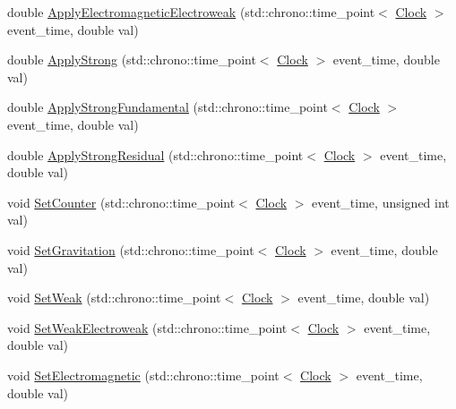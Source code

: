 \begin{DoxyCompactItemize}
\item 
double \mbox{\hyperlink{classCompositeForceParticle_a5f6aef9e15e2e5f346c7ede76ae6458b}{Apply\+Electromagnetic\+Electroweak}} (std\+::chrono\+::time\+\_\+point$<$ \mbox{\hyperlink{universe_8h_a0ef8d951d1ca5ab3cfaf7ab4c7a6fd80}{Clock}} $>$ event\+\_\+time, double val)
\item 
double \mbox{\hyperlink{classCompositeForceParticle_ac1464a04fbbca2d8927dfdbef0429878}{Apply\+Strong}} (std\+::chrono\+::time\+\_\+point$<$ \mbox{\hyperlink{universe_8h_a0ef8d951d1ca5ab3cfaf7ab4c7a6fd80}{Clock}} $>$ event\+\_\+time, double val)
\item 
double \mbox{\hyperlink{classCompositeForceParticle_a64fe19ee12d6ca0a69f650faa5bedb58}{Apply\+Strong\+Fundamental}} (std\+::chrono\+::time\+\_\+point$<$ \mbox{\hyperlink{universe_8h_a0ef8d951d1ca5ab3cfaf7ab4c7a6fd80}{Clock}} $>$ event\+\_\+time, double val)
\item 
double \mbox{\hyperlink{classCompositeForceParticle_ae0937405e68dd40b19036d5a359f7e07}{Apply\+Strong\+Residual}} (std\+::chrono\+::time\+\_\+point$<$ \mbox{\hyperlink{universe_8h_a0ef8d951d1ca5ab3cfaf7ab4c7a6fd80}{Clock}} $>$ event\+\_\+time, double val)
\item 
void \mbox{\hyperlink{classCompositeForceParticle_a41cee6bd5a75fbf67fa6e76a9e7d7605}{Set\+Counter}} (std\+::chrono\+::time\+\_\+point$<$ \mbox{\hyperlink{universe_8h_a0ef8d951d1ca5ab3cfaf7ab4c7a6fd80}{Clock}} $>$ event\+\_\+time, unsigned int val)
\item 
void \mbox{\hyperlink{classCompositeForceParticle_ad9e1553ab0096230edd591e3135b223d}{Set\+Gravitation}} (std\+::chrono\+::time\+\_\+point$<$ \mbox{\hyperlink{universe_8h_a0ef8d951d1ca5ab3cfaf7ab4c7a6fd80}{Clock}} $>$ event\+\_\+time, double val)
\item 
void \mbox{\hyperlink{classCompositeForceParticle_a7899a6efda98b062051e37c25c214e2a}{Set\+Weak}} (std\+::chrono\+::time\+\_\+point$<$ \mbox{\hyperlink{universe_8h_a0ef8d951d1ca5ab3cfaf7ab4c7a6fd80}{Clock}} $>$ event\+\_\+time, double val)
\item 
void \mbox{\hyperlink{classCompositeForceParticle_a73a3792ae1c334e74f945fea56083f0b}{Set\+Weak\+Electroweak}} (std\+::chrono\+::time\+\_\+point$<$ \mbox{\hyperlink{universe_8h_a0ef8d951d1ca5ab3cfaf7ab4c7a6fd80}{Clock}} $>$ event\+\_\+time, double val)
\item 
void \mbox{\hyperlink{classCompositeForceParticle_a476c0d570c3be75c9e186df1ec2a5cda}{Set\+Electromagnetic}} (std\+::chrono\+::time\+\_\+point$<$ \mbox{\hyperlink{universe_8h_a0ef8d951d1ca5ab3cfaf7ab4c7a6fd80}{Clock}} $>$ event\+\_\+time, double val)

\end{DoxyCompactItemize}
